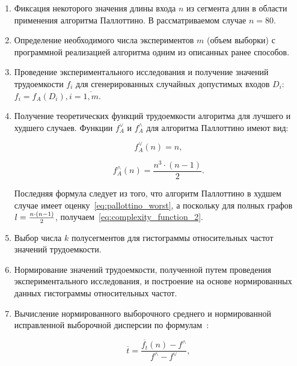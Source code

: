 \documentclass[a4paper, article, 14pt]{extarticle}
\begin{document}
\begin{enumerate}
	\item Фиксация некоторого значения длины входа $n$ из сегмента длин в области применения алгоритма Паллоттино. В рассматриваемом случае $n = 80$.

	\item Определение необходимого числа экспериментов $m$ (объем выборки) с программной реализацией алгоритма одним из описанных ранее способов.

	\item Проведение экспериментального исследования и получение значений трудоемкости $f_i$ для сгенерированных случайных допустимых входов $D_i$: $f_i = f_A(D_i), i = \overline{1, m}$.

	\item Получение теоретических функций трудоемкости алгоритма для лучшего и худшего случаев. Функции $f_A^\vee$ и $f_A^\wedge$ для алгоритма Паллоттино имеют вид:

	\begin{equation}\label{eq:complexity_function_1}
		f_A^\vee(n) = n,
	\end{equation}

	\begin{equation}\label{eq:complexity_function_2}
		f_A^\wedge(n) = \frac{n^3 \cdot (n - 1)}{2}.
	\end{equation}

	Последняя формула следует из того, что алгоритм Паллоттино в худшем случае имеет оценку~\eqref{eq:pallottino_worst}, а поскольку для полных графов\\$l = {n \cdot (n - 1) \over{2}}$, получаем~\eqref{eq:complexity_function_2}.

	\item Выбор числа $k$ полусегментов для гистограммы относительных частот значений трудоемкости.

	\item Нормирование значений трудоемкости, полученной путем проведения экспериментального исследования, и построение на основе нормированных данных гистограммы относительных частот.

	\item Вычисление нормированного выборочного среднего и нормированной исправленной выборочной дисперсии по формулам~\cite{petrushyn_ulyanov_planning}:

	\begin{equation}\label{eq:mean}
		\overline{t} = \frac{\overline{f_t}(n) - f^\wedge}{f^\wedge - f^\vee},
	\end{equation}


\end{enumerate}
\end{document}
